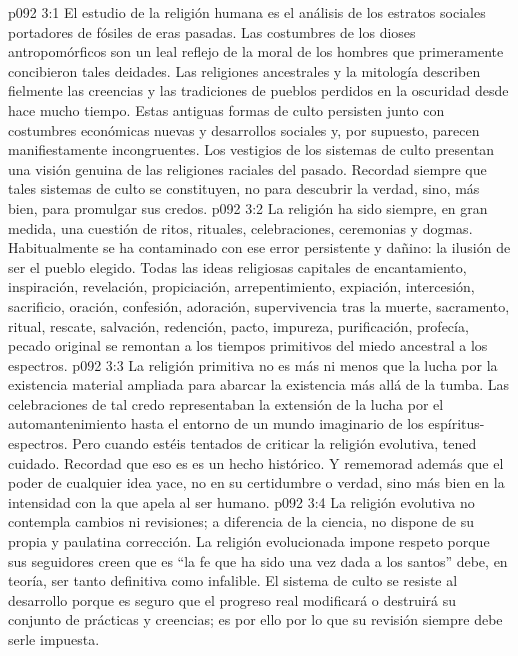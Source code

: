 \vs p092 3:1 El estudio de la religión humana es el análisis de los estratos sociales portadores de fósiles de eras pasadas. Las costumbres de los dioses antropomórficos son un leal reflejo de la moral de los hombres que primeramente concibieron tales deidades. Las religiones ancestrales y la mitología describen fielmente las creencias y las tradiciones de pueblos perdidos en la oscuridad desde hace mucho tiempo. Estas antiguas formas de culto persisten junto con costumbres económicas nuevas y desarrollos sociales y, por supuesto, parecen manifiestamente incongruentes. Los vestigios de los sistemas de culto presentan una visión genuina de las religiones raciales del pasado. Recordad siempre que tales sistemas de culto se constituyen, no para descubrir la verdad, sino, más bien, para promulgar sus credos.
\vs p092 3:2 La religión ha sido siempre, en gran medida, una cuestión de ritos, rituales, celebraciones, ceremonias y dogmas. Habitualmente se ha contaminado con ese error persistente y dañino: la ilusión de ser el pueblo elegido. Todas las ideas religiosas capitales de encantamiento, inspiración, revelación, propiciación, arrepentimiento, expiación, intercesión, sacrificio, oración, confesión, adoración, supervivencia tras la muerte, sacramento, ritual, rescate, salvación, redención, pacto, impureza, purificación, profecía, pecado original se remontan a los tiempos primitivos del miedo ancestral a los espectros.
\vs p092 3:3 \pc La religión primitiva no es más ni menos que la lucha por la existencia material ampliada para abarcar la existencia más allá de la tumba. Las celebraciones de tal credo representaban la extensión de la lucha por el automantenimiento hasta el entorno de un mundo imaginario de los espíritus\hyp{}espectros. Pero cuando estéis tentados de criticar la religión evolutiva, tened cuidado. Recordad que eso es  es un hecho histórico. Y rememorad además que el poder de cualquier idea yace, no en su certidumbre o verdad, sino más bien en la intensidad con la que apela al ser humano.
\vs p092 3:4 \pc La religión evolutiva no contempla cambios ni revisiones; a diferencia de la ciencia, no dispone de su propia y paulatina corrección. La religión evolucionada impone respeto porque sus seguidores creen que es  “la fe que ha sido una vez dada a los santos” debe, en teoría, ser tanto definitiva como infalible. El sistema de culto se resiste al desarrollo porque es seguro que el progreso real modificará o destruirá su conjunto de prácticas y creencias; es por ello por lo que su revisión siempre debe serle impuesta.
